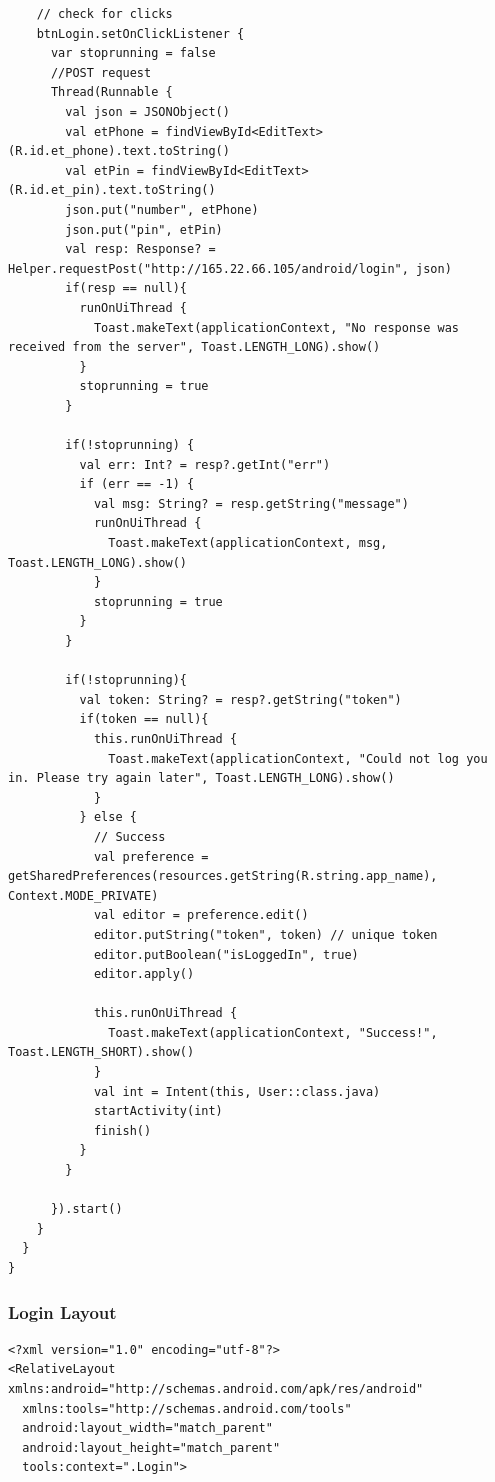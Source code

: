 \documentclass[11pt, a4paper]{article}
\begin{document}
\begin{appendices}
\begin{lstlisting}
    // check for clicks
    btnLogin.setOnClickListener {
      var stoprunning = false
      //POST request
      Thread(Runnable {
        val json = JSONObject()
        val etPhone = findViewById<EditText>(R.id.et_phone).text.toString()
        val etPin = findViewById<EditText>(R.id.et_pin).text.toString()
        json.put("number", etPhone)
        json.put("pin", etPin)
        val resp: Response? = Helper.requestPost("http://165.22.66.105/android/login", json)
        if(resp == null){
          runOnUiThread {
            Toast.makeText(applicationContext, "No response was received from the server", Toast.LENGTH_LONG).show()
          }
          stoprunning = true
        }

        if(!stoprunning) {
          val err: Int? = resp?.getInt("err")
          if (err == -1) {
            val msg: String? = resp.getString("message")
            runOnUiThread {
              Toast.makeText(applicationContext, msg, Toast.LENGTH_LONG).show()
            }
            stoprunning = true
          }
        }

        if(!stoprunning){
          val token: String? = resp?.getString("token")
          if(token == null){
            this.runOnUiThread {
              Toast.makeText(applicationContext, "Could not log you in. Please try again later", Toast.LENGTH_LONG).show()
            }
          } else {
            // Success
            val preference = getSharedPreferences(resources.getString(R.string.app_name), Context.MODE_PRIVATE)
            val editor = preference.edit()
            editor.putString("token", token) // unique token
            editor.putBoolean("isLoggedIn", true)
            editor.apply()

            this.runOnUiThread {
              Toast.makeText(applicationContext, "Success!", Toast.LENGTH_SHORT).show()
            }
            val int = Intent(this, User::class.java)
            startActivity(int)
            finish()
          }
        }

      }).start()
    }
  }
}
\end{lstlisting}
\subsubsection{Login Layout}
\begin{lstlisting}
<?xml version="1.0" encoding="utf-8"?>
<RelativeLayout xmlns:android="http://schemas.android.com/apk/res/android"
  xmlns:tools="http://schemas.android.com/tools"
  android:layout_width="match_parent"
  android:layout_height="match_parent"
  tools:context=".Login">


\end{lstlisting}
\end{appendices}
\end{document}
